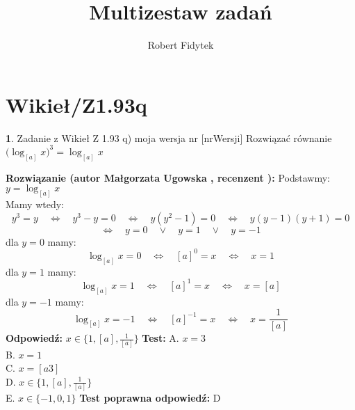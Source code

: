 \documentclass[12pt, a4paper]{article}
\title{Multizestaw zadań}
\author{Robert Fidytek}
\date{}
\theoremstyle{definition} %
\newtheorem{zad}{}
\newcommand{\kategoria}[1]{\section{#1}} %
\newcommand{\zadStart}[1]{\begin{zad}#1\newline} %
\newcommand{\zadStop}{\end{zad}}   %
\newcommand{\rozwStart}[2]{\noindent \textbf{Rozwiązanie (autor #1 , recenzent #2): }\newline} %
\newcommand{\rozwStop}{\newline}                                            %
\newcommand{\odpStart}{\noindent \textbf{Odpowiedź:}\newline}    %
\newcommand{\odpStop}{\newline}                                             %
\newcommand{\testStart}{\noindent \textbf{Test:}\newline} %
\newcommand{\testStop}{\newline} %
\newcommand{\kluczStart}{\noindent \textbf{Test poprawna odpowiedź:}\newline} %
\newcommand{\kluczStop}{\newline} %
\begin{document}
\maketitle


\kategoria{Wikieł/Z1.93q}
\zadStart{Zadanie z Wikieł Z 1.93 q) moja wersja nr [nrWersji]}
Rozwiązać równanie $\big(\log_{[a]}{x}\big)^3=\log_{[a]}{x}$
\zadStop
\rozwStart{Małgorzata Ugowska}{}
Podstawmy: $y=\log_{[a]}{x}$\\
Mamy wtedy:
$$y^3=y \quad \Longleftrightarrow \quad y^3-y=0 \quad \Longleftrightarrow \quad y(y^2-1)=0 \quad \Longleftrightarrow \quad y(y-1)(y+1)=0$$
$$\Longleftrightarrow \quad y=0 \quad \vee \quad y=1 \quad \vee \quad y=-1$$
dla $y=0$ mamy:
$$\log_{[a]}{x} = 0 \quad \Longleftrightarrow \quad [a]^0=x \quad \Longleftrightarrow \quad x=1$$
dla $y=1$ mamy:
$$\log_{[a]}{x} = 1 \quad \Longleftrightarrow \quad [a]^1=x \quad \Longleftrightarrow \quad x=[a]$$
dla $y=-1$ mamy:
$$\log_{[a]}{x} = -1 \quad \Longleftrightarrow \quad [a]^{-1}=x \quad \Longleftrightarrow \quad x=\frac{1}{[a]}$$
\rozwStop
\odpStart
$x \in \{1, [a], \frac{1}{[a]}\}$
\odpStop
\testStart
A. $x=3$\\
B. $x=1$\\
C. $x = [a3]$\\
D. $x \in \{1, [a], \frac{1}{[a]}\}$\\
E. $x \in \{-1, 0, 1\}$
\testStop
\kluczStart
D
\kluczStop
\end{document}
